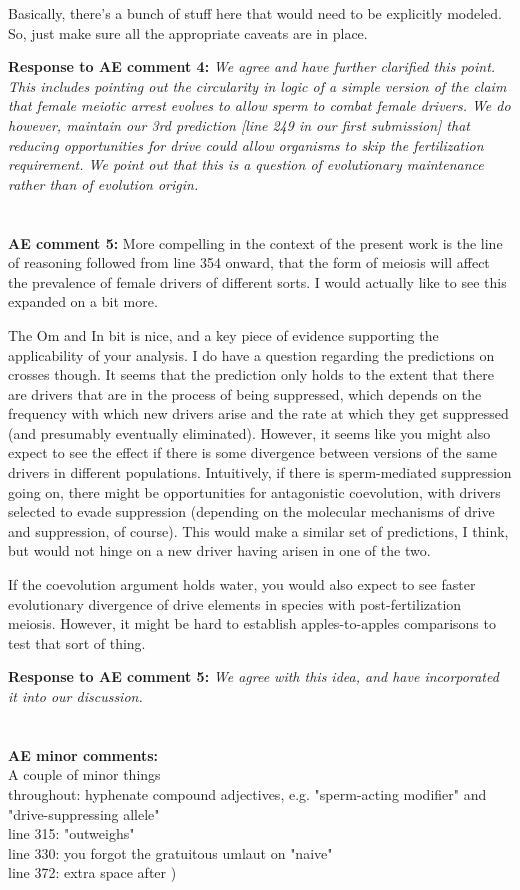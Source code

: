 \documentclass[12pt,letterpaper]{article}
\begin{document}
Basically, there's a bunch of stuff here that would need to be explicitly modeled. So, just make sure all the appropriate caveats are in place.

{\bf{Response to AE comment 4:}}  \emph{We agree and have further clarified this point. This includes pointing out the circularity in logic of a simple version of the claim that female meiotic arrest evolves to allow sperm to combat female drivers. We do however, maintain our 3rd prediction [line 249 in our first submission] that reducing opportunities for drive could allow organisms to skip the fertilization requirement. We point out that this is a question of evolutionary maintenance rather than of evolution origin.}
\\
\\
\\
{\bf{AE comment 5:}}
More compelling in the context of the present work is the line of reasoning followed from line 354 onward, that the form of meiosis will affect the prevalence of female drivers of different sorts. I would actually like to see this expanded on a bit more.

The Om and In bit is nice, and a key piece of evidence supporting the applicability of your analysis. I do have a question regarding the predictions on crosses though. It seems that the prediction only holds to the extent that there are drivers that are in the process of being suppressed, which depends on the frequency with which new drivers arise and the rate at which they get suppressed (and presumably eventually eliminated). However, it seems like you might also expect to see the effect if there is some divergence between versions of the same drivers in different populations. Intuitively, if there is sperm-mediated suppression going on, there might be opportunities for antagonistic coevolution, with drivers selected to evade suppression (depending on the molecular mechanisms of drive and suppression, of course). This would make a similar set of predictions, I think, but would not hinge on a new driver having arisen in one of the two.

If the coevolution argument holds water, you would also expect to see faster evolutionary divergence of drive elements in species with post-fertilization meiosis. However, it might be hard to establish apples-to-apples comparisons to test that sort of thing.

{\bf{Response to AE comment 5:}} \emph{We agree with this idea, and have incorporated it into our discussion.}
\\
\\
\\
{\bf{AE minor comments:}}
\\
A couple of minor things
\\
throughout: hyphenate compound adjectives, e.g. "sperm-acting modifier" and "drive-suppressing allele"
\\
line 315: "outweighs"
\\
line 330: you forgot the gratuitous umlaut on "naive"
\\
line 372: extra space after )
\end{document}
